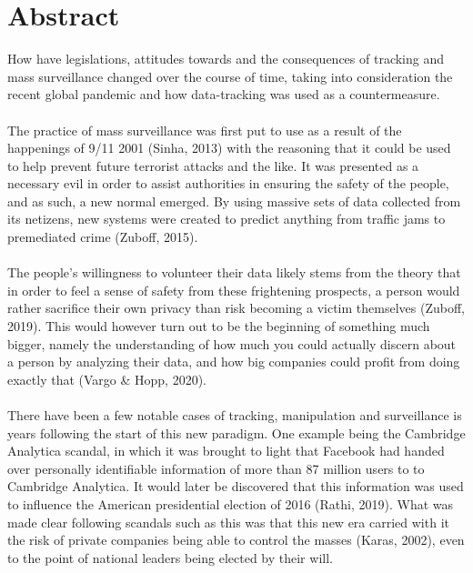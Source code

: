 \documentclass[11pt]{article}
\begin{document}
\section{Abstract}
How have legislations, attitudes towards and the consequences of tracking and mass surveillance changed over the course of time, taking into consideration the recent global pandemic and how data-tracking was used as a countermeasure. 
\\ \\
The practice of mass surveillance was first put to use as a result of the happenings of 9/11 2001 (Sinha, 2013) with the reasoning that it could be used to help prevent future terrorist attacks and the like. It was presented as a necessary evil in order to assist authorities in ensuring the safety of the people, and as such, a new normal emerged. By using massive sets of data collected from its netizens, new systems were created to predict anything from traffic jams to premediated crime (Zuboff, 2015).
\\ \\
The people’s willingness to volunteer their data likely stems from the theory that in order to feel a sense of safety from these frightening prospects, a person would rather sacrifice their own privacy than risk becoming a victim themselves (Zuboff, 2019). This would however turn out to be the beginning of something much bigger, namely the understanding of how much you could actually discern about a person by analyzing their data, and how big companies could profit from doing exactly that (Vargo \& Hopp, 2020).
\\ \\
There have been a few notable cases of tracking, manipulation and surveillance is years following the start of this new paradigm. One example being the Cambridge Analytica scandal, in which it was brought to light that Facebook had handed over personally identifiable information of more than 87 million users to to Cambridge Analytica. It would later be discovered that this information was used to influence the American presidential election of 2016 (Rathi, 2019). What was made clear following scandals such as this was that this new era carried with it the risk of private companies being able to control the masses (Karas, 2002), even to the point of national leaders being elected by their will. 
\\ \\
\end{document}
